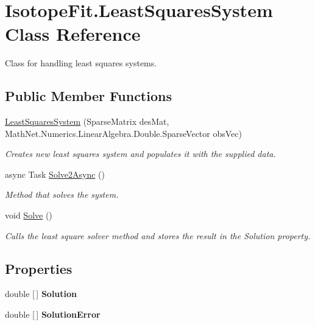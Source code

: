 \hypertarget{class_isotope_fit_1_1_least_squares_system}{}\section{Isotope\+Fit.\+Least\+Squares\+System Class Reference}
\label{class_isotope_fit_1_1_least_squares_system}


Class for handling least squares systems.  


\subsection*{Public Member Functions}
\begin{DoxyCompactItemize}
\item 
\mbox{\hyperlink{class_isotope_fit_1_1_least_squares_system_a5e014a3cc9f4ee7b700d89de2d1f2a4d}{Least\+Squares\+System}} (Sparse\+Matrix des\+Mat, Math\+Net.\+Numerics.\+Linear\+Algebra.\+Double.\+Sparse\+Vector obs\+Vec)
\begin{DoxyCompactList}\small\item\em Creates new least squares system and populates it with the supplied data. \end{DoxyCompactList}\item 
async Task \mbox{\hyperlink{class_isotope_fit_1_1_least_squares_system_ad831a418d7e7601dc7a64f5f7143534f}{Solve2\+Async}} ()
\begin{DoxyCompactList}\small\item\em Method that solves the system. \end{DoxyCompactList}\item 
void \mbox{\hyperlink{class_isotope_fit_1_1_least_squares_system_ac72b8568e9ecb97077102658f56aba3f}{Solve}} ()
\begin{DoxyCompactList}\small\item\em Calls the least square solver method and stores the result in the Solution property. \end{DoxyCompactList}\end{DoxyCompactItemize}
\subsection*{Properties}
\begin{DoxyCompactItemize}
\item 
\mbox{\label{class_isotope_fit_1_1_least_squares_system_a617be79d453e62bdd056dea7d66c8a9e}} 
double \mbox{[}$\,$\mbox{]} {\bfseries Solution}
\item 
\mbox{\label{class_isotope_fit_1_1_least_squares_system_a408575af0561c165c18bc2c93a046d00}} 
double \mbox{[}$\,$\mbox{]} {\bfseries Solution\+Error}
\end{DoxyCompactItemize}


